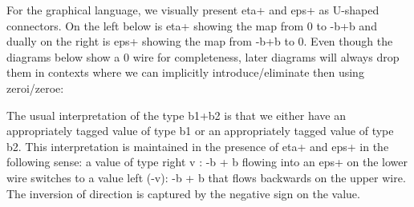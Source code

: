 \documentclass[preprint]{sigplanconf}
\begin{document}
For the graphical language, we visually present {{eta+}} and {{eps+}} as
U-shaped connectors. On the left below is {{eta+}} showing the map from {{0}}
to {{-b+b}} and dually on the right is {{eps+}} showing the map from {{-b+b}}
to 0. Even though the diagrams below show a {{0}} wire for completeness,
later diagrams will always drop them in contexts where we can implicitly
introduce/eliminate then using {{zeroi}}/{{zeroe}}:
\begin{multicols}{2}
\begin{center}
\end{center}
  
\begin{center}
\end{center}
\end{multicols}

The usual interpretation of the type {{b1+b2}} is that we either have an
appropriately tagged value of type {{b1}} or an appropriately tagged value of
type {{b2}}. This interpretation is maintained in the presence of {{eta+}}
and {{eps+}} in the following sense: a value of type {{right v : -b + b}}
flowing into an {{eps+}} on the lower wire switches to a value 
{{left (-v): -b + b}} that flows backwards on the upper wire. The inversion of
direction is captured by the negative sign on the value. 

\begin{multicols}{2}
\begin{center}
\end{center}
  
\begin{center}
\end{center}  
\end{multicols}
\end{document}
